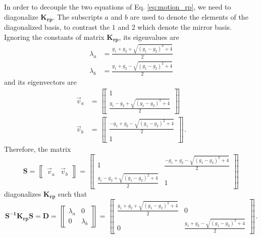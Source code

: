 In order to decouple the two equations of Eq. \ref{eq:motion_rp}, we
need to diagonalize $\mathbf{K_{rp}}$. The subscripts $a$ and $b$ are
used to denote the elements of the diagonalized basis, to contrast the
$1$ and $2$ which denote the mirror basis. Ignoring the constants of
matrix $\mathbf{K_{rp}}$, its eigenvalues are
\begin{align}
\lambda_a &= \frac{g_1 + g_2 + \sqrt{(g_1 - g_2)^2 + 4}}{2} \\
\lambda_b &= \frac{g_1 + g_2 - \sqrt{(g_1 - g_2)^2 + 4}}{2} 
\label{eq:eigenvalues}
\end{align}
and its eigenvectors are
\begin{align}
\vec{v}_a &= \left\llbracket \begin{array}{c} 
1 \\
\frac{g_1 - g_2 + \sqrt{(g_1 - g_2)^2 + 4}} {2} \end{array} \right\rrbracket\\
\vec{v}_b &= \left\llbracket \begin{array}{c}
\frac{ -g_1 + g_2 - \sqrt{(g_1 - g_2)^2 + 4}}{2} \label{eq:eigenvectors}\\
1 \end{array} \right\rrbracket .
\end{align}
Therefore, the matrix 
\begin{equation}
\mathbf{S} = \left\llbracket \begin{array}{cc} 
\vec{v}_a & \vec{v}_b \end{array} \right\rrbracket =
\left\llbracket \begin{array}{cc}
 1 & \frac{-g_1 + g_2 - \sqrt{(g_1 - g_2)^2 + 4}} {2}\\
 \frac{g_1 - g_2 + \sqrt{(g_1 - g_2)^2 + 4}} {2} & 1\end{array} \right\rrbracket
\label{eq:S}
\end{equation}
diagonalizes $\mathbf{K_{rp}}$ such that 
\begin{equation}
\mathbf{S^{-1} K_{rp} S} = \mathbf{D} = \left\llbracket \begin{array}{cc} 
\lambda_a & 0 \\
0 & \lambda_b \end{array} \right\rrbracket = \left\llbracket \begin{array}{cc}
 \frac{g_1 + g_2 + \sqrt{(g_1 - g_2)^2 + 4}}{2}  & 0\\
 0 & \frac{g_1 + g_2 - \sqrt{(g_1 - g_2)^2 + 4}}{2}\end{array}
\right\rrbracket .
\label{eq:diag}
\end{equation}
